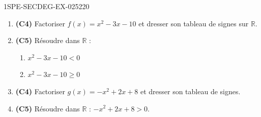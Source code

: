 \begin{exercice}{1SPE-SECDEG-EX-025}{2}{20}
\begin{enumerate}
  \item \textbf{(C4)} Factoriser $f(x) = x^2 - 3x - 10$ et dresser son tableau de signes sur $\mathbb{R}$.
  \item \textbf{(C5)} Résoudre dans $\mathbb{R}$ :
  \begin{enumerate}
    \item $x^2 - 3x - 10 < 0$
    \item $x^2 - 3x - 10 \geqslant 0$
  \end{enumerate}
  \item \textbf{(C4)} Factoriser $g(x) = -x^2 + 2x + 8$ et dresser son tableau de signes.
  \item \textbf{(C5)} Résoudre dans $\mathbb{R}$ : $-x^2 + 2x + 8 > 0$.
\end{enumerate}
\end{exercice}
